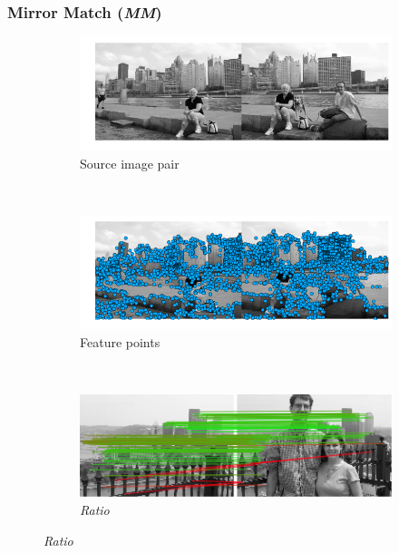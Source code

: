 \documentclass{article}
\begin{document}
\subsubsection{Mirror Match (\emph{MM})}

\begin{figure}
	\centering%
		\begin{subfigure}[t]{\columnwidth}
			\centering
			\includegraphics[width=0.85\columnwidth]{images/MMC_pitts_source}
			\caption{Source image pair}
			\label{fig:pitts_source}
		\end{subfigure}%
		\\ %
		\begin{subfigure}[t]{\columnwidth}
			\centering
			\includegraphics[width=0.85\columnwidth]{images/MMC_pitts_keypoints}
			\caption{Feature points}
			\label{fig:pitts_keypoints}
		\end{subfigure}%
		\\ %
		\begin{subfigure}[t]{\columnwidth}
			\centering
			\includegraphics[width=0.85\columnwidth]{images/mirror_match_off}
			\caption{\emph{Ratio}}
			\label{fig:unique}
		\end{subfigure}%

\end{figure}
\end{document}
